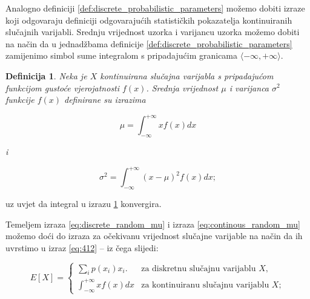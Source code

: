 \documentclass[a4paper,12pt,oneside]{memoir}
\newtheorem{definition}{Definicija}[chapter]
\begin{document}
                Analogno definiciji \ref{def:discrete_probabilistic_parameters} možemo dobiti izraze koji odgovaraju definiciji odgovarajućih statističkih pokazatelja kontinuiranih slučajnih varijabli. Srednju vrijednost uzorka i varijancu uzorka možemo dobiti na način da u jednadžbama definicije \ref{def:discrete_probabilistic_parameters} zamijenimo simbol sume integralom s pripadajućim granicama $\langle-\infty,+\infty\rangle$.

                \begin{definition}
                    Neka je $X$ kontinuirana slučajna varijabla s pripadajućom funkcijom gustoće vjerojatnosti $f(x)$. Srednja vrijednost $\mu$ i varijanca $\sigma^2$ funkcije $f(x)$ definirane su izrazima

                    \begin{equation}
                        \mu=\displaystyle\int_{-\infty}^{+\infty}xf(x)dx
                        \label{eq:continous_random_mu}
                    \end{equation}

                    i

                    \begin{equation}
                        \sigma^2=\displaystyle\int_{-\infty}^{+\infty}(x-\mu)^2f(x)dx;
                        \label{eq:continous_random_sigma}
                    \end{equation}
                    \label{def:continous_probabilistic_parameters}
                \end{definition}

                uz uvjet da integral u izrazu \ref{def:continous_probabilistic_parameters} konvergira.

                Temeljem izraza \eqref{eq:discrete_random_mu} i izraza \eqref{eq:continous_random_mu} možemo doći do izraza za očekivanu vrijednost slučajne varijable na način da ih uvrstimo u izraz \eqref{eq:412} -- iz čega slijedi:

                \begin{equation}
                    E\left[X\right]=
                    \begin{cases}
                        \displaystyle\sum_{i}^{}p(x_i)x_i. & \text{za diskretnu slučajnu varijablu } X,\\
                        \displaystyle\int_{-\infty}^{+\infty}xf(x)dx & \text{za kontinuiranu slučajnu varijablu } X;
                    \end{cases}
                    \label{eq:joint_expectation}      
                \end{equation}
\end{document}

